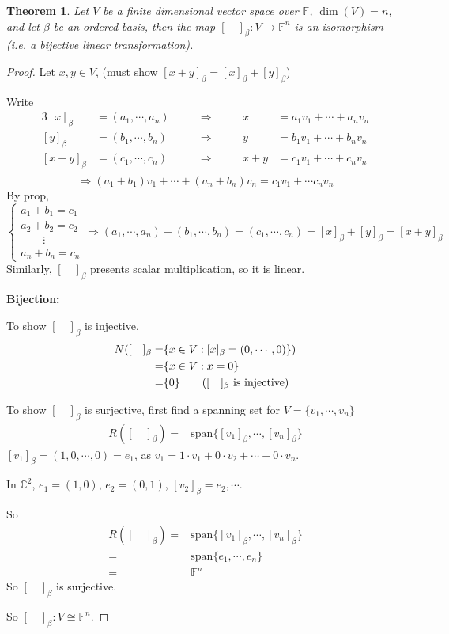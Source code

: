 \documentclass[12pt]{article}
\theoremstyle{plain}
\newtheorem{theorem}{Theorem}[subsection]
\newcommand{\Span}{\mathrm{span}}
\newcommand{\mC}{{\mathbb{C}}}
\newcommand{\mF}{{\mathbb{F}}}
\begin{document}
	\begin{theorem}
		Let $V$ be a finite dimensional vector space over $\mF$, $\dim(V) = n$,
		and let $\beta$ be an ordered basis, then the map 
		$[ \quad ]_{\beta} : V\to \mF^n$ is an isomorphism (i.e. a bijective 
		linear transformation).  
	\end{theorem}
	\begin{proof}
		Let $x, y \in V$, (must show $[x+y]_{\beta} = [x]_{\beta}+[y]_{\beta}$)

		Write 
		\begin{alignat*}{3}
			[x]_{\beta} &= (a_1, \cdots, a_n) 
						&\qquad \Rightarrow \qquad &
			x &= a_1v_1 + \cdots+a_nv_n\\
			[y]_{\beta} &= (b_1, \cdots, b_n)
						&\qquad \Rightarrow \qquad& 
			y &= b_1v_1 + \cdots+b_nv_n\\
			[x+y]_{\beta} &= (c_1, \cdots, c_n)
						  &\qquad \Rightarrow \qquad &
			x+y &= c_1v_1 + \cdots+c_nv_n\\
		\end{alignat*}
		\[
			\Rightarrow (a_1+b_1)v_1+\cdots+(a_n+b_n)v_n = c_1v_1+\cdots c_nv_n
		\]
		By prop, 
		\[
			\begin{cases}
				a_1+b_1=c_1\\
				a_2+b_2=c_2\\
				\qquad \vdots\\
				a_n+b_n=c_n
			\end{cases}
			\Rightarrow (a_1,\cdots,a_n) + (b_1,\cdots, b_n) = (c_1,\cdots,c_n)
			= [x]_{\beta}+[y]_{\beta}=[x+y]_{\beta} 
		\]
		Similarly, $[\quad ]_{\beta}$ presents scalar multiplication, so it is
		linear. 

		\textbf{Bijection: }

		To show $[\quad]_{\beta}$ is injective, 
		\begin{align*}
			N([\quad]_{\beta} 
			=& \{x \in V: [x]_{\beta} = (0,\cdots,0)\})\\
			=& \{x \in V: x = 0\}\\
			=& \{0\}    \tag{$[\quad]_{\beta}$ is injective}
		\end{align*}

		To show $[\quad]_{\beta}$ is surjective,
		first find a spanning set for 
		$V = \{v_1,\cdots, v_n\}$
		\begin{align*}
			R([\quad]_{\beta}) 
			=& \Span\{[v_1]_{\beta}, \cdots, [v_n]_{\beta}\}
		\end{align*}
		$[v_1]_{\beta} = (1,0,\cdots, 0) = e_1$, 
		as $v_1 = 1\cdot v_1 + 0 \cdot v_2 + \cdots + 0 \cdot v_n$. 

		In $\mC^2$, $e_1 = (1, 0)$, $e_2 = (0,1)$, $[v_2]_{\beta} = e_2,\cdots$.

		So 
		\begin{align*}
			R([\quad]_{\beta}) 
			=& \Span\{[v_1]_{\beta}, \cdots, [v_n]_{\beta}\}\\
			=& \Span \{e_1,\cdots, e_n\}\\
			=& \mF^n 
		\end{align*}
		So $[\quad]_{\beta}$ is surjective. 

		So $[\quad]_{\beta} : V\cong \mF^n$. 

		\end{proof}
\end{document}
